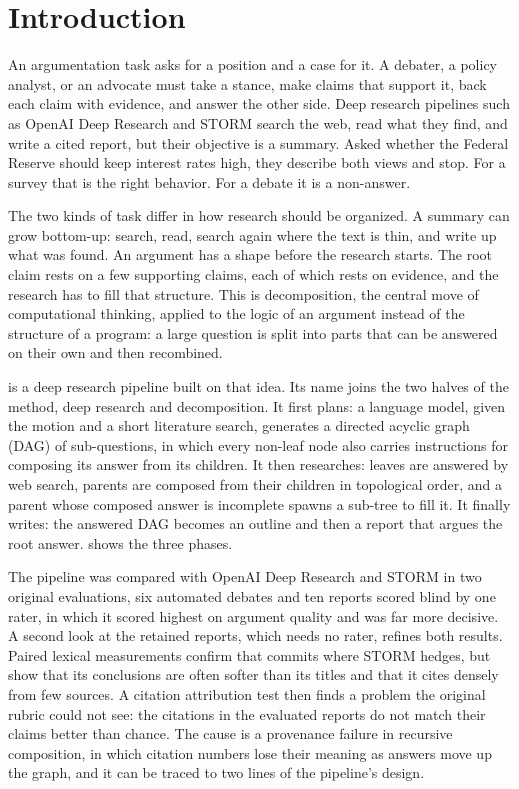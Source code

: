 \section{Introduction}
\label{sec:intro}

An argumentation task asks for a position and a case for it. A debater, a policy analyst, or an advocate must take a stance, make claims that support it, back each claim with evidence, and answer the other side. Deep research pipelines such as OpenAI Deep Research \citep{openai2025deepresearch} and STORM \citep{shao2024storm} search the web, read what they find, and write a cited report, but their objective is a summary. Asked whether the Federal Reserve should keep interest rates high, they describe both views and stop. For a survey that is the right behavior. For a debate it is a non-answer.

The two kinds of task differ in how research should be organized. A summary can grow bottom-up: search, read, search again where the text is thin, and write up what was found. An argument has a shape before the research starts. The root claim rests on a few supporting claims, each of which rests on evidence, and the research has to fill that structure. This is decomposition, the central move of computational thinking, applied to the logic of an argument instead of the structure of a program: a large question is split into parts that can be answered on their own and then recombined.

\sys{} is a deep research pipeline built on that idea. Its name joins the two halves of the method, deep research and decomposition. It first plans: a language model, given the motion and a short literature search, generates a directed acyclic graph (DAG) of sub-questions, in which every non-leaf node also carries instructions for composing its answer from its children. It then researches: leaves are answered by web search, parents are composed from their children in topological order, and a parent whose composed answer is incomplete spawns a sub-tree to fill it. It finally writes: the answered DAG becomes an outline and then a report that argues the root answer.  shows the three phases.

The pipeline was compared with OpenAI Deep Research and STORM in two original evaluations, six automated debates and ten reports scored blind by one rater, in which it scored highest on argument quality and was far more decisive. A second look at the retained reports, which needs no rater, refines both results. Paired lexical measurements confirm that \sys{} commits where STORM hedges, but show that its conclusions are often softer than its titles and that it cites densely from few sources. A citation attribution test then finds a problem the original rubric could not see: the citations in the evaluated reports do not match their claims better than chance. The cause is a provenance failure in recursive composition, in which citation numbers lose their meaning as answers move up the graph, and it can be traced to two lines of the pipeline's design.

